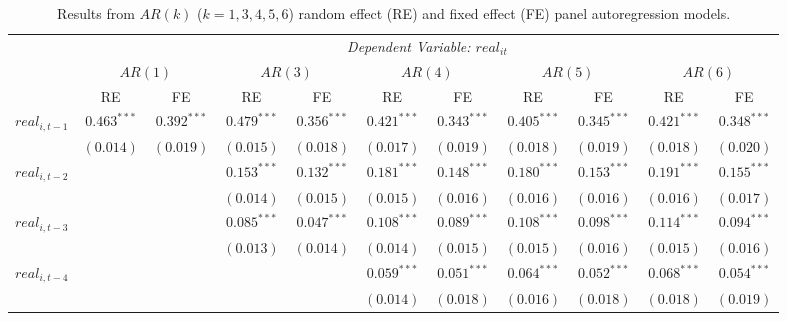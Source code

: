 \begin{table}
\scriptsize
\begin{center}
\caption{Results from $AR(k)$ ($k = 1, 3, 4, 5, 6$) random effect (RE) and fixed effect (FE) panel autoregression models.}
\setlength{\tabcolsep}{4pt}
\begin{tabular}{lcccccccccc}
\toprule 
 & \multicolumn{10}{c}{\textit{Dependent Variable: $real_{it}$}} \\
 \addlinespace
 & \multicolumn{2}{c}{$AR(1)$} &\multicolumn{2}{c}{$AR(3)$} &\multicolumn{2}{c}{$AR(4)$} &\multicolumn{2}{c}{$AR(5)$} & \multicolumn{2}{c}{$AR(6)$}\\
 & RE & FE & RE & FE & RE & FE & RE & FE & RE & FE \\
\midrule
$real_{i, t-1}$      & $0.463^{***}$  & $0.392^{***}$ & $0.479^{***}$  & $0.356^{***}$  & $0.421^{***}$  & $0.343^{***}$  & $0.405^{***}$  & $0.345^{***}$  & $0.421^{***}$  & $0.348^{***}$  \\
                         & $(0.014)$      & $(0.019)$     & $(0.015)$      & $(0.018)$      & $(0.017)$      & $(0.019)$      & $(0.018)$      & $(0.019)$      & $(0.018)$      & $(0.020)$      \\
\addlinespace
$real_{i, t-2}$        &                &               & $0.153^{***}$  & $0.132^{***}$  & $0.181^{***}$  & $0.148^{***}$  & $0.180^{***}$  & $0.153^{***}$  & $0.191^{***}$  & $0.155^{***}$  \\
                         &                &               & $(0.014)$      & $(0.015)$      & $(0.015)$      & $(0.016)$      & $(0.016)$      & $(0.016)$      & $(0.016)$      & $(0.017)$      \\
\addlinespace
$real_{i, t-3}$         &                &               & $0.085^{***}$  & $0.047^{***}$  & $0.108^{***}$  & $0.089^{***}$  & $0.108^{***}$  & $0.098^{***}$  & $0.114^{***}$  & $0.094^{***}$  \\
                         &                &               & $(0.013)$      & $(0.014)$      & $(0.014)$      & $(0.015)$      & $(0.015)$      & $(0.016)$      & $(0.015)$      & $(0.016)$      \\
\addlinespace
$real_{i, t-4}$        &                &               &                &                & $0.059^{***}$  & $0.051^{***}$  & $0.064^{***}$  & $0.052^{***}$  & $0.068^{***}$  & $0.054^{***}$  \\
                         &                &               &                &                & $(0.014)$      & $(0.018)$      & $(0.016)$      & $(0.018)$      & $(0.018)$      & $(0.019)$      \\

\end{tabular}
\end{center}
\end{table}
